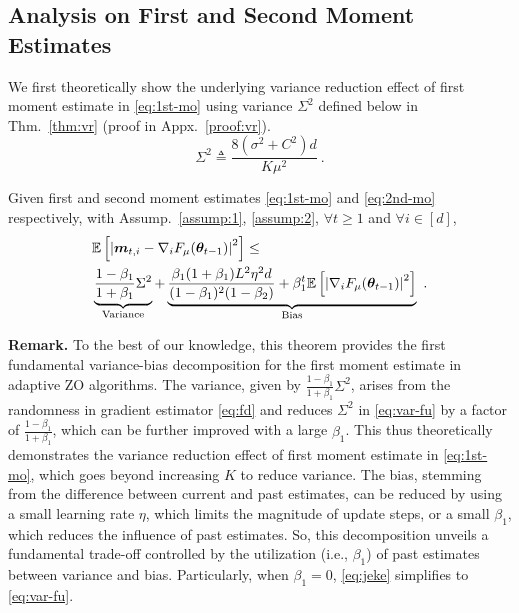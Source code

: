 \subsection{Analysis on First and Second Moment Estimates}\label{sec:bounds}
We first theoretically show the underlying variance reduction effect of first moment estimate in \eqref{eq:1st-mo} using variance $\Sigma^2$ defined below in Thm.~\ref{thm:vr} (proof in Appx.~\ref{proof:vr}).
\begin{equation}\label{eq:sigma2}
\Sigma^2 \triangleq \frac{8(\sigma^2 + C^2)d}{K\mu^2} \ .
\end{equation}
\begin{theorem}\label{thm:vr}
Given first and second moment estimates \eqref{eq:1st-mo} and \eqref{eq:2nd-mo} respectively, with Assump.~\ref{assump:1}, \ref{assump:2}, $\forall{t}\geq1$ and $\forall{i}\in[d]$,
\begin{equation}
\begin{aligned}
&\mathbb{E}\left[\left|{\bm{m}}_{t,i} - \nabla_i F_{\mu}({\bm{\theta}}_{t-1})\right|^2\right] \leq \\
&\underbrace{\frac{1-\beta_1}{1 + \beta_1} \Sigma^2}_{\text{\normalfont Variance}} + \underbrace{\frac{\beta_1(1+\beta_1)L^2\eta^2 d}{(1 - \beta_1)^2(1 - \beta_2)} + \beta_1^t \mathbb{E}\left[\left|\nabla_i F_{\mu}({\bm{\theta}}_{t-1})\right|^2\right]}_{\text{\normalfont Bias}} \ . \label{eq:jeke}
\end{aligned}
\end{equation}
\end{theorem}
\textbf{Remark.} To the best of our knowledge, this theorem provides the first fundamental variance-bias decomposition for the first moment estimate in adaptive ZO algorithms. The variance, given by $\frac{1-\beta_1}{1+\beta_1}\Sigma^2$, arises from the randomness in gradient estimator \eqref{eq:fd} and reduces $\Sigma^2$ in \eqref{eq:var-fu} by a factor of $\frac{1-\beta_1}{1+\beta_1}$, which can be further improved with a large $\beta_1$. This thus theoretically demonstrates the variance reduction effect of first moment estimate in \eqref{eq:1st-mo}, which goes beyond increasing $K$ to reduce variance. The bias, stemming from the difference between current and past estimates, can be reduced by using a small learning rate $\eta$, which limits the magnitude of update steps, or a small $\beta_1$, which reduces the influence of past estimates. So, this decomposition unveils a fundamental trade-off controlled by the utilization  (i.e., $\beta_1$) of past estimates between variance and bias. Particularly, when $\beta_1=0$, \eqref{eq:jeke} simplifies to \eqref{eq:var-fu}.

